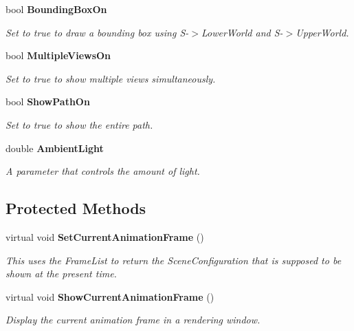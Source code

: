 \begin{CompactItemize}
bool {\bf Bounding\-Box\-On}
\begin{CompactList}\small\item\em Set to true to draw a bounding box using S-$>$Lower\-World and S-$>$Upper\-World.\item\end{CompactList}\item 
bool {\bf Multiple\-Views\-On}
\begin{CompactList}\small\item\em Set to true to show multiple views simultaneously.\item\end{CompactList}\item 
bool {\bf Show\-Path\-On}
\begin{CompactList}\small\item\em Set to true to show the entire path.\item\end{CompactList}\item 
double {\bf Ambient\-Light}
\begin{CompactList}\small\item\em A parameter that controls the amount of light.\item\end{CompactList}\end{CompactItemize}
\subsection*{Protected Methods}
\begin{CompactItemize}
\item 
virtual void {\bf Set\-Current\-Animation\-Frame} ()
\begin{CompactList}\small\item\em This uses the Frame\-List to return the Scene\-Configuration that is supposed to be shown at the present time.\item\end{CompactList}\item 
virtual void {\bf Show\-Current\-Animation\-Frame} ()
\begin{CompactList}\small\item\em Display the current animation frame in a rendering window.\item\end{CompactList}\end{CompactItemize}

